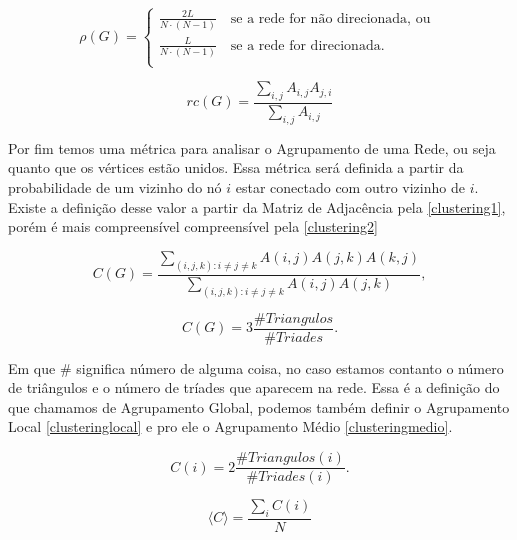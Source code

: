 \[   
  \rho(G) = 
     \begin{cases}
      \frac{2L}{N\cdot(N-1)} \quad \text{se a rede for não direcionada, ou }\\
      \frac{L}{N\cdot(N-1)} \quad \text{se a rede for direcionada.} \\
     \end{cases}
\]

\begin{equation}
  rc(G) = \frac{\sum_{i,j} A_{i,j}A_{j,i}}{\sum_{i,j} A_{i,j}}
\end{equation}

Por fim temos uma métrica para analisar o Agrupamento de uma Rede, ou seja quanto que os vértices estão unidos. Essa métrica será definida a partir da probabilidade de um vizinho do nó $i$ estar conectado com outro vizinho de $i$. Existe a definição desse valor a partir da Matriz de Adjacência pela \ref{clustering1}, porém é mais compreensível compreensível pela \ref{clustering2}

\begin{equation}
  C(G) = \frac{\sum_{(i,j,k): i\neq j \neq k}A(i,j)A(j,k)A(k,j)}{\sum_{(i,j,k): i\neq j \neq k}A(i,j)A(j,k)},
  \label{clustering1}
\end{equation}

\begin{equation}
  C(G) = 3\frac{\#Triangulos}{\#Triades}.
  \label{clustering2}
\end{equation}

Em que $\#$ significa número de alguma coisa, no caso estamos contanto o número de triângulos e o número de tríades que aparecem na rede. Essa é a definição do que chamamos de Agrupamento Global, podemos também definir o Agrupamento Local \ref{clusteringlocal} e pro ele o Agrupamento Médio \ref{clusteringmedio}. 

\begin{equation}
  C(i) = 2\frac{\#Triangulos(i)}{\#Triades(i)}.
  \label{clusteringlocal}
\end{equation}

\begin{equation}
  \langle C \rangle = \frac{\sum\limits_{i} C(i)}{N}
  \label{clusteringmedio}
\end{equation}


